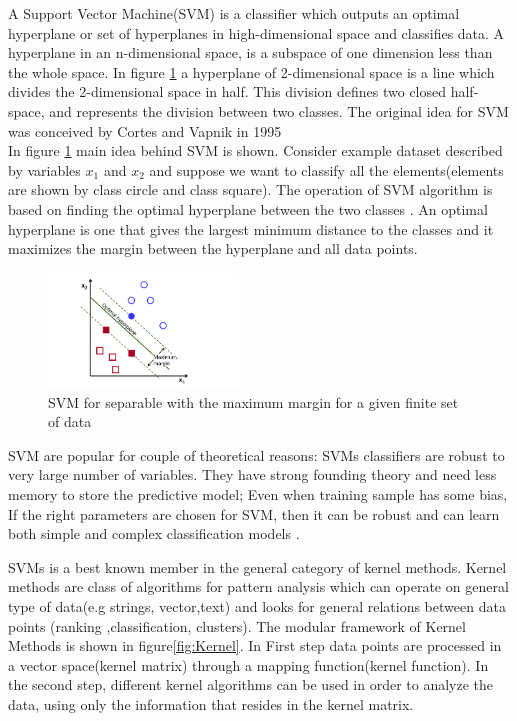 A Support Vector Machine(SVM) is a classifier which outputs an optimal hyperplane or set of hyperplanes in high-dimensional space and classifies data. A hyperplane in an n-dimensional space, is a subspace of one dimension less than the whole space. In figure \ref{fig:SVM} a hyperplane of 2-dimensional space is a line which divides the 2-dimensional space in half. This division defines two closed half-space, and represents the division between two classes. The original idea for SVM was conceived by Cortes and Vapnik in 1995 \cite{cortes1995support} \\
In figure \ref{fig:SVM} main idea behind SVM is shown. Consider example dataset described by variables $x_1$ and $x_2$ and suppose we want to classify all the elements(elements are shown by class circle and class square). The operation of SVM algorithm is based on finding the optimal hyperplane between the two classes \cite{opencv_library}. An optimal hyperplane is one that gives the largest minimum distance to the classes and it maximizes the margin between the hyperplane and all data points. %

\begin{figure}[H]
    \includegraphics[width=0.45\textwidth]{./img/SVM.png}
     \caption{\footnotesize{SVM for separable with the maximum margin for a given finite set of data }}
    \label{fig:SVM}
\end{figure}


SVM are popular for couple of theoretical reasons: SVMs classifiers are robust to very large number of variables. They have strong founding theory and need less memory to store the predictive model; Even when training sample has some bias, If the right parameters are chosen for SVM, then it can be robust\cite{auria2008support} and can learn both simple and complex classification models \cite{cristianini2000}. 


SVMs is a best known member in the general category of kernel methods. Kernel methods are class of algorithms for pattern analysis which can operate on general type of data(e.g strings, vector,text) and looks for general relations between data points (ranking ,classification, clusters). The modular framework of Kernel Methods is shown in figure\ref{fig:Kernel}. In First step data points are processed in a vector space(kernel matrix) through a mapping function(kernel function). In the second step, different kernel algorithms can be used in order to analyze the data, using only the information that resides in the kernel matrix. \cite{shawe2004kernel}\\

